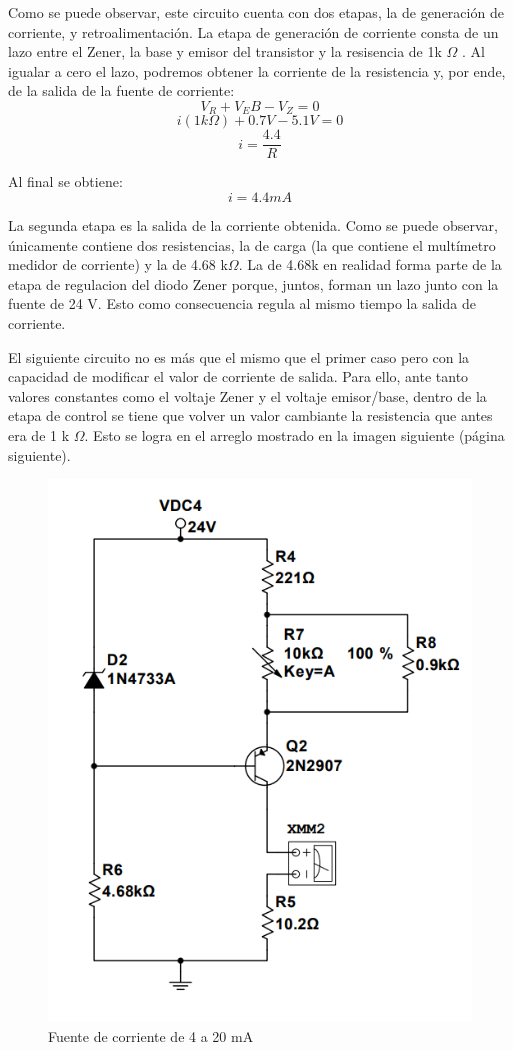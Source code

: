 Como se puede observar, este circuito cuenta con dos etapas, la de generación de corriente, y retroalimentación. La
etapa de generación de corriente consta de un lazo entre el Zener, la base y emisor del transistor y la resisencia de
1k \(\Omega\) . Al igualar a cero el lazo, podremos obtener la corriente de la resistencia y, por ende, de la salida de
la fuente de corriente:
\[ V_R + V_EB - V_Z = 0 \]
\[ i(1k \Omega ) + 0.7V -5.1V = 0 \]
\[ i = \frac{4.4}{R} \]

Al final se obtiene:
\[ i = 4.4 mA \]

La segunda etapa es la salida de la corriente obtenida. Como se puede observar, únicamente contiene dos resistencias, la de
carga (la que contiene el multímetro medidor de corriente) y la de 4.68 k\(\Omega\). La de 4.68k en realidad forma parte de
la etapa de regulacion del diodo Zener porque, juntos, forman un lazo junto con la fuente de 24 V. Esto como consecuencia regula
al mismo tiempo la salida de corriente.

El siguiente circuito no es más que el mismo que el primer caso pero con la capacidad de modificar el valor de corriente de salida.
Para ello, ante tanto valores constantes como el voltaje Zener y el voltaje emisor/base, dentro de la etapa de control se tiene
que volver un valor cambiante la resistencia que antes era de 1 k \(\Omega\). Esto se logra en el arreglo mostrado en la imagen
siguiente (página siguiente).

\begin{figure}[htb]
    \centering
    \includegraphics[scale=0.6]{media/casoB.png}
    \caption{Fuente de corriente de 4 a 20 mA}
    \label{Fig: Fuente de corriente de 4 a 20 mA}
\end{figure}

